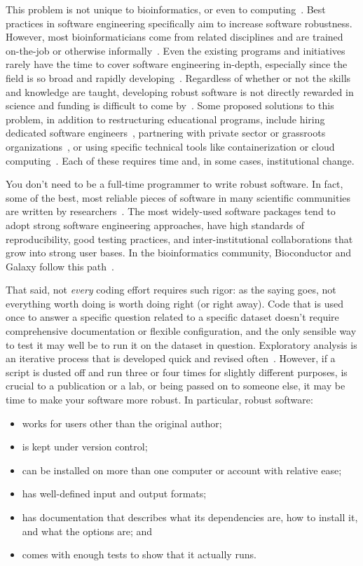 \documentclass[10pt,letterpaper]{article}
\begin{document}
This problem is not unique to bioinformatics, or even to computing~\cite{baker2016}. 
Best practices in software engineering specifically aim to increase software
robustness. However, most bioinformaticians come from related disciplines and
are trained on-the-job or otherwise informally~\cite{prins2015,atwood2015}. Even
the existing programs and initiatives rarely have the time to cover software engineering
in-depth, especially since the field is so broad and rapidly
developing~\cite{atwood2015,lawlor2015}. Regardless of whether or not the skills
and knowledge are taught, developing robust software is not directly rewarded
in science and funding is difficult to come by~\cite{prins2015}. Some proposed
solutions to this problem, in addition to restructuring educational programs,
include hiring dedicated software engineers~\cite{lawlor2015,sanders2008},
partnering with private sector or grassroots organizations~\cite{prins2015,ison2016},
or using specific technical tools like containerization or cloud
computing~\cite{afgan2016,howe2012}. Each of these requires time and, in some
cases, institutional change.

You don't need to be a full-time programmer to write robust software. In fact,
some of the best, most reliable pieces of software in many scientific
communities are written by researchers~\cite{prabhu2011,sanders2008}. 
The most widely-used software packages tend to adopt strong software
engineering approaches, have high standards of reproducibility, good testing
practices, and inter-institutional collaborations that grow into strong user
bases. In the bioinformatics community, Bioconductor and Galaxy follow this
path~\cite{gentleman2004,afgan2016}.

That said, not \emph{every} coding effort requires such rigor:
as the saying goes, not everything worth doing is worth doing right (or right away).
Code that is used once to answer a specific question related to a specific dataset
doesn't require comprehensive documentation or flexible configuration,
and the only sensible way to test it may well be to run it on the dataset in
question. Exploratory analysis is an iterative process that is developed
quick and revised often~\cite{lawlor2015,sanders2008}. 
However, if a script is dusted off and run three or four
times for slightly different purposes,
is crucial to a publication or a lab,
or being passed on to someone else,
it may be time to make your software more robust.
In particular, robust software:

\begin{itemize}
\item
  works for users other than the original author;
\item
  is kept under version control;
\item
  can be installed on more than one computer or account with relative ease;
\item
  has well-defined input and output formats;
\item
  has documentation that describes what its dependencies are, how to
  install it, and what the options are; and
\item
  comes with enough tests to show that it actually runs.
\end{itemize}
\end{document}
